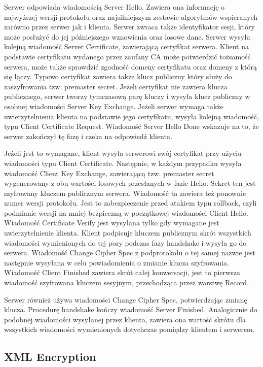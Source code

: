 Serwer odpowiada wiadomością Server Hello. Zawiera ona informację o najwyższej wersji protokołu oraz najsilniejszym zestawie algorytmów wspieranych zarówno przez serwer jak i klienta. Serwer zwraca także identyfikator sesji, który może posłużyć do jej późniejszego wznowienia oraz losowe dane.
Serwer wysyła kolejną wiadomość Server Certificate, zawierającą certyfikat serwera. Klient na podstawie certyfikatu wydanego przez zaufany CA może potwierdzić tożsamość serwera, może także sprawdzić zgodność domeny certyfikatu oraz domeny z którą się łączy. Typowo certyfikat zawiera także klucz publiczny który służy do zaszyfrowania tzw. premaster secret. Jeżeli certyfikat nie zawiera klucza publicznego, serwer tworzy tymczasową parę kluczy i wysyła klucz publiczny w osobnej wiadomości Server Key Exchange. Jeżeli serwer wymaga także uwierzytelnienia klienta na podstawie jego certyfikatu, wysyła kolejną wiadomość, typu Client Certificate Request. Wiadomość Server Hello Done wskazuje na to, że serwer zakończył tę fazę i czeka na odpowiedź klienta.

Jeżeli jest to wymagane, klient wysyła serwerowi swój certyfikat przy użyciu wiadomości typu Client Certificate. Następnie, w każdym przypadku wysyła wiadomość Client Key Exchange, zawierającą tzw. premaster secret wygenerowany z obu wartości losowych przesłanych w fazie Hello. Sekret ten jest szyfrowany kluczem publicznym serwera. Wiadomość ta zawiera też ponownie numer wersji protokołu. Jest to zabezpieczenie przed atakiem typu rollback, czyli podmianie wersji na mniej bezpieczną w początkowej wiadomości Client Hello. Wiadomość Certificate Verify jest wysyłana tylko gdy wymagane jest uwierzytelnienie klienta. Klient podpisuje kluczem publicznym skrót wszystkich wiadomości wymienionych do tej pory podczas fazy handshake i wysyła go do serwera. Wiadomość Change Cipher Spec z podprotokołu o tej samej nazwie jest następnie wysyłana w celu powiadomienia o zmianie klucza szyfrowania. Wiadomość Client Finished zawiera skrót całej konwersacji, jest to pierwsza wiadomość szyfrowana kluczem sesyjnym, przechodząca przez warstwę Record. 

Serwer również używa wiadomości Change Cipher Spec, potwierdzając zmianę klucza. Procedurę handshake kończy wiadomość Server Finished. Analogicznie do podobnej wiadomości wysyłanej przez klienta, zawiera ona wartość skrótu dla wszystkich wiadomości wymienionych dotychczas pomiędzy klientem i serwerem.


\subsection{XML Encryption}

